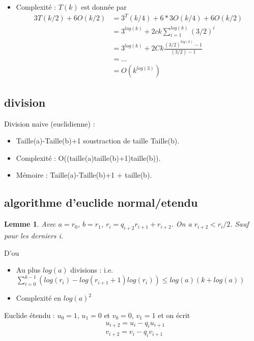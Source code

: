 \documentclass[12pt]{article}
\theoremstyle{plain}
\newtheorem{lem}[subsubsection]{Lemme}
\theoremstyle{definition}
\begin{document}
\begin{itemize}
    \item Complexité : $T(k)$ est donnée par 
    \begin{align*}
        3T(k/2)+6O(k/2)&=3^T(k/4)+6*3O(k/4)+6O(k/2)\\
        &=3^{log(k)}+2ck\sum_{i=1}^{log(k)}(3/2)^i\\
        &=3^{log(k)}+2Ck\frac{(3/2)^{log(k)} - 1}{(3/2) - 1}\\
        &=\dots\\
        &=O(k^{log(3)})
    \end{align*}

\end{itemize}

\subsection{division}
Division naive (euclidienne) :
\begin{itemize}
    \item Taille(a)-Taille(b)+1 soustraction de taille Taille(b).
    \item Complexité : O((taille(a)taille(b)+1)taille(b)).
    \item Mémoire : Taille(a)-Taille(b)+1  +  taille(b).
\end{itemize}


\subsection{algorithme d'euclide normal/etendu}
\begin{lem}
    Avec $a=r_0$, $b=r_1$, $r_{i}=q_{i+2}r_{i+1}+r_{i+2}$. On a $r_{i+2}<r_i/2$. Sauf pour les derniers i.
\end{lem}

D'ou
\begin{itemize}
    \item Au plus $log(a)$ divisions : i.e. $\sum_{i=0}^{k-1}(log(r_i)-log(r_{i+1}+1)log(r_i))\leq log(a)(k+log(a))$
    \item Complexité en $log(a)^2$
\end{itemize}

Euclide étendu : $u_0=1$, $u_1=0$ et $v_0=0$, $v_1=1$ et on écrit
\begin{align*}
    &u_{i+2}=u_i-q_iu_{i+1}\\
    &v_{i+2}=v_i-q_iv_{i+1}\\
\end{align*}
\end{document}
